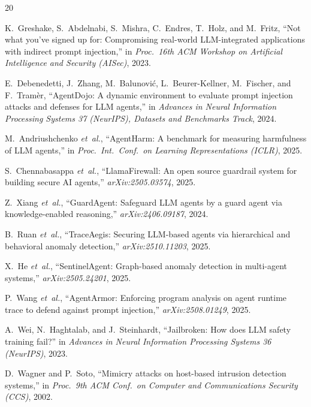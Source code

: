 \documentclass[conference]{IEEEtran}
\begin{document}
\balance
\begin{thebibliography}{20}

K.~Greshake, S.~Abdelnabi, S.~Mishra, C.~Endres, T.~Holz, and M.~Fritz,
``Not what you've signed up for: Compromising real-world LLM-integrated
applications with indirect prompt injection,'' in \emph{Proc.\ 16th ACM
Workshop on Artificial Intelligence and Security (AISec)}, 2023.

E.~Debenedetti, J.~Zhang, M.~Balunovi\'c, L.~Beurer-Kellner, M.~Fischer, and
F.~Tram\`er, ``AgentDojo: A dynamic environment to evaluate prompt injection
attacks and defenses for LLM agents,'' in \emph{Advances in Neural Information
Processing Systems 37 (NeurIPS), Datasets and Benchmarks Track}, 2024.

M.~Andriushchenko \emph{et~al.}, ``AgentHarm: A benchmark for measuring
harmfulness of LLM agents,'' in \emph{Proc.\ Int.\ Conf.\ on Learning
Representations (ICLR)}, 2025.

S.~Chennabasappa \emph{et~al.}, ``LlamaFirewall: An open source guardrail
system for building secure AI agents,'' \emph{arXiv:2505.03574}, 2025.

Z.~Xiang \emph{et~al.}, ``GuardAgent: Safeguard LLM agents by a guard agent
via knowledge-enabled reasoning,'' \emph{arXiv:2406.09187}, 2024.

B.~Ruan \emph{et~al.}, ``TraceAegis: Securing LLM-based agents via
hierarchical and behavioral anomaly detection,'' \emph{arXiv:2510.11203},
2025.

X.~He \emph{et~al.}, ``SentinelAgent: Graph-based anomaly detection in
multi-agent systems,'' \emph{arXiv:2505.24201}, 2025.

P.~Wang \emph{et~al.}, ``AgentArmor: Enforcing program analysis on agent
runtime trace to defend against prompt injection,'' \emph{arXiv:2508.01249},
2025.

A.~Wei, N.~Haghtalab, and J.~Steinhardt, ``Jailbroken: How does LLM safety
training fail?'' in \emph{Advances in Neural Information Processing Systems 36
(NeurIPS)}, 2023.

D.~Wagner and P.~Soto, ``Mimicry attacks on host-based intrusion detection
systems,'' in \emph{Proc.\ 9th ACM Conf.\ on Computer and Communications
Security (CCS)}, 2002.


\end{thebibliography}
\end{document}
